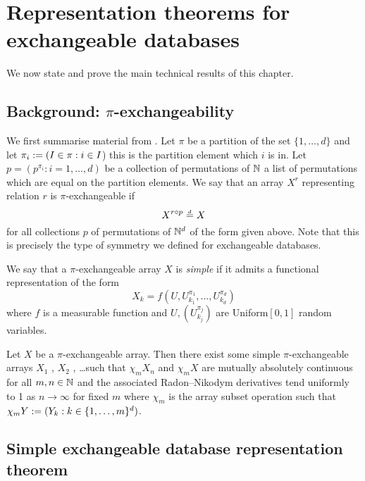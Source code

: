 \section{Representation theorems for exchangeable databases}
\label{sec:proof_database}

We now state and prove the main technical results of this chapter.

\subsection{Background: $\pi$-exchangeability}

We first summarise material from \citet{Kallenberg1999-pj}.
Let $\pi$ be a partition of the set $\{1,\dots,d\}$ and let $\pi_i := (I \in \pi : i \in I$) \ie this is the partition element which $i$ is in.
Let $p = (p^{\pi_i} : i = 1,\dots,d)$ be a collection of permutations of $\mathbb{N}$ \ie a list of permutations which are equal on the partition elements.
We say that an array $X^r$ representing relation $r$ is $\pi$-exchangeable if 
\begin{equation}
  X^{r\circ p} \overset{\,_{\!d}}{=} X
\end{equation}
for all collections $p$ of permutations of $\mathbb{N}^d$ of the form given above.
Note that this is precisely the type of symmetry we defined for exchangeable databases.

We say that a $\pi$-exchangeable array $X$ is \emph{simple} if it admits a functional representation of the form
\begin{equation}
  X_{k} = f(U, U^{\pi_1}_{k_1}, \dots, U^{\pi_d}_{k_d})
\end{equation}
where $f$ is a measurable function and $U, (U^{\pi_j}_{k_j})$ are \iid Uniform$[0,1]$ random variables.

\begin{prop}
  \label{thm:piex}
  Let $X$ be a $\pi$-exchangeable array.
  Then there exist some simple $\pi$-exchangeable arrays $X_1$ , $X_2$ , \dots such that
  $\chi_m X_n$ and $\chi_m X$ are mutually absolutely continuous for all $m,n \in \mathbb{N}$ and the associated Radon--Nikodym derivatives tend
  uniformly to 1 as $n \to \infty$ for fixed $m$ where $\chi_m$ is the array subset operation such that $\chi_m Y := (Y_{k} : k \in \{1,\dots,m\}^d)$.
\end{prop}

\subsection{Simple exchangeable database representation theorem}

